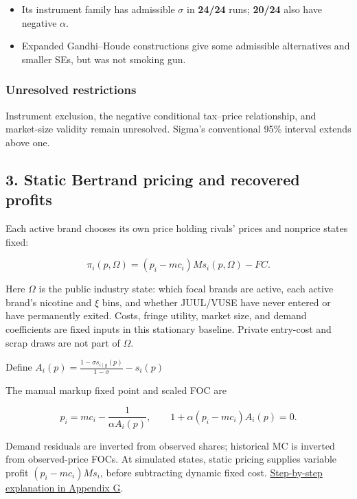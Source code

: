 \documentclass[11pt,]{article}
\providecommand{\tightlist}{%
  \setlength{\itemsep}{0pt}\setlength{\parskip}{0pt}}
\begin{document}
\begin{itemize}
\tightlist
\item
  Its instrument family has admissible \(\sigma\) in \textbf{24/24}
  runs; \textbf{20/24} also have negative \(\alpha\).
\item
  Expanded Gandhi--Houde constructions give some admissible alternatives
  and smaller SEs, but was not smoking gun.
\end{itemize}

\subsubsection{Unresolved restrictions}\label{unresolved-restrictions}

Instrument exclusion, the negative conditional tax--price relationship,
and market-size validity remain unresolved. Sigma's conventional 95\%
interval extends above one.

\clearpage

\hypertarget{static-bertrand-pricing-and-recovered-profits}{\subsection{3.
Static Bertrand pricing and recovered
profits}\label{static-bertrand-pricing-and-recovered-profits}}

Each active brand chooses its own price holding rivals' prices and
nonprice states fixed:

\[
\pi_i(p,\Omega)=(p_i-mc_i)M s_i(p,\Omega)-FC.
\]

Here \(\Omega\) is the public industry state: which focal brands are
active, each active brand's nicotine and \(\xi\) bins, and whether
JUUL/VUSE have never entered or have permanently exited. Costs, fringe
utility, market size, and demand coefficients are fixed inputs in this
stationary baseline. Private entry-cost and scrap draws are not part of
\(\Omega\).

Define \(A_i(p)=\frac{1-\sigma s_{i\mid g}(p)}{1-\sigma}-s_i(p)\)

The manual markup fixed point and scaled FOC are

\[
p_i=mc_i-\frac{1}{\alpha A_i(p)},\qquad
1+\alpha(p_i-mc_i)A_i(p)=0.
\]

Demand residuals are inverted from observed shares; historical MC is
inverted from observed-price FOCs. At simulated states, static pricing
supplies variable profit \((p_i-mc_i)Ms_i\), before subtracting dynamic
fixed cost.
\protect\hyperlink{appendix-g-from-observed-shares-to-simulated-profits}{Step-by-step
explanation in Appendix G}.
\end{document}

